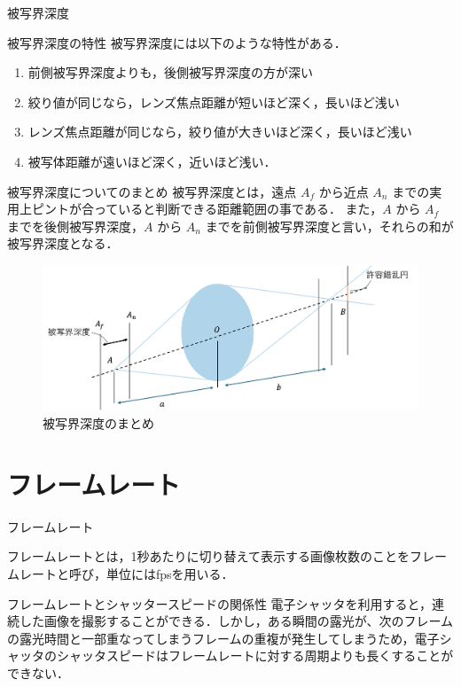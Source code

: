 \documentclass[8pt, jfont=ipaexm, t]{beamer} %
\begin{document}
\begin{frame}[allowframebreaks]{被写界深度}
    \newpage

    \begin{block}{被写界深度の特性}
      被写界深度には以下のような特性がある．
      \begin{enumerate}
        \item 前側被写界深度よりも，後側被写界深度の方が深い
        \item 絞り値が同じなら，レンズ焦点距離が短いほど深く，長いほど浅い
        \item レンズ焦点距離が同じなら，絞り値が大きいほど深く，長いほど浅い
        \item 被写体距離が遠いほど深く，近いほど浅い．
      \end{enumerate}
    \end{block}

    \newpage
    \begin{block}{被写界深度についてのまとめ}
      被写界深度とは，遠点 $A_f$ から近点 $A_n$ までの実用上ピントが合っていると判断できる距離範囲の事である．
      また，$A$ から $A_f$ までを後側被写界深度，$A$ から $A_n$ までを前側被写界深度と言い，それらの和が被写界深度となる．
    \end{block}
    \begin{figure}[H]
      \centering
      \includegraphics[scale=0.35]{figure/09.png}
      \caption{被写界深度のまとめ}
      \label{fig:09}
    \end{figure}

\end{frame}




\section{フレームレート}
\begin{frame}{フレームレート}
\begin{block}{}
  フレームレートとは，1秒あたりに切り替えて表示する画像枚数のことをフレームレートと呼び，単位にはfpsを用いる．
\end{block}
\begin{block}{フレームレートとシャッタースピードの関係性}
  電子シャッタを利用すると，連続した画像を撮影することができる．しかし，ある瞬間の露光が、次のフレームの露光時間と一部重なってしまうフレームの重複が発生してしまうため，電子シャッタのシャッタスピードはフレームレートに対する周期よりも長くすることができない．
\end{block}
\end{frame}
\end{document}
